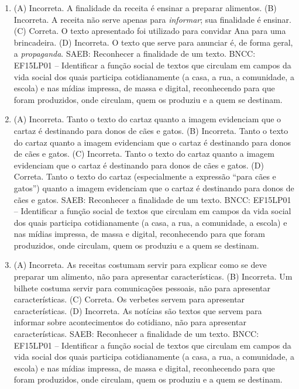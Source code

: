 \begin{enumerate}
\item
(A) Incorreta. A finalidade da receita é ensinar a preparar alimentos.
(B) Incorreta. A receita não serve apenas para \textit{informar}; sua
finalidade é ensinar.  
(C) Correta. O texto apresentado foi utilizado para convidar Ana para uma brincadeira.
(D) Incorreta. O texto que serve para anunciar é, de forma geral, a 
\textit{propaganda}.
SAEB: Reconhecer a finalidade de um texto.
BNCC: EF15LP01 -- Identificar a função social de textos que circulam em
campos da vida social dos quais participa cotidianamente (a casa, a rua,
a comunidade, a escola) e nas mídias impressa, de massa e digital,
reconhecendo para que foram produzidos, onde circulam, quem os produziu
e a quem se destinam.

\item
(A) Incorreta. Tanto o texto do cartaz quanto a imagem evidenciam que
o cartaz é destinando para donos de cães e gatos.
(B) Incorreta. Tanto o texto do cartaz quanto a imagem evidenciam que
o cartaz é destinando para donos de cães e gatos.
(C) Incorreta. Tanto o texto do cartaz quanto a imagem evidenciam que
o cartaz é destinando para donos de cães e gatos.
(D) Correta. Tanto o texto do cartaz (especialmente a expressão ``para
cães e gatos'') quanto a imagem evidenciam que o cartaz é destinando para
donos de cães e gatos.
SAEB: Reconhecer a finalidade de um texto.
BNCC: EF15LP01 -- Identificar a função social de textos que circulam em
campos da vida social dos quais participa cotidianamente (a casa, a rua,
a comunidade, a escola) e nas mídias impressa, de massa e digital,
reconhecendo para que foram produzidos, onde circulam, quem os produziu
e a quem se destinam.

\item
(A) Incorreta. As receitas costumam servir para explicar como se deve
preparar um alimento, não para apresentar características.
(B) Incorreta. Um bilhete costuma servir para comunicações pessoais,
não para apresentar características.
(C) Correta. Os verbetes servem para apresentar características. 
(D) Incorreta. As notícias são textos que servem para informar sobre 
acontecimentos do cotidiano, não para apresentar características. 
SAEB: Reconhecer a finalidade de um texto.
BNCC: EF15LP01 -- Identificar a função social de textos que circulam em
campos da vida social dos quais participa cotidianamente (a casa, a rua,
a comunidade, a escola) e nas mídias impressa, de massa e digital,
reconhecendo para que foram produzidos, onde circulam, quem os produziu
e a quem se destinam.
\end{enumerate}

